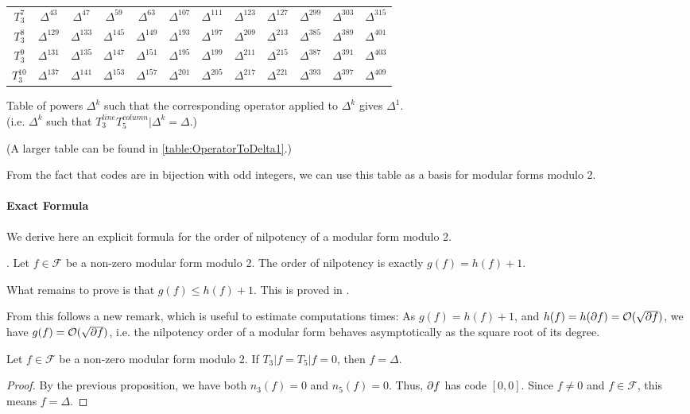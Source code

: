 \begin{center}
\begin{tabular}{|c||ccccccccccc|}
		$T_3^{7}$ & $\Delta^{43}$ & $\Delta^{47}$ & $\Delta^{59}$ & $\Delta^{63}$ & $\Delta^{107}$ & $\Delta^{111}$ & $\Delta^{123}$ & $\Delta^{127}$ & $\Delta^{299}$ & $\Delta^{303}$ & $\Delta^{315}$ \\
		$T_3^{8}$ & $\Delta^{129}$ & $\Delta^{133}$ & $\Delta^{145}$ & $\Delta^{149}$ & $\Delta^{193}$ & $\Delta^{197}$ & $\Delta^{209}$ & $\Delta^{213}$ & $\Delta^{385}$ & $\Delta^{389}$ & $\Delta^{401}$ \\
		$T_3^{9}$ & $\Delta^{131}$ & $\Delta^{135}$ & $\Delta^{147}$ & $\Delta^{151}$ & $\Delta^{195}$ & $\Delta^{199}$ & $\Delta^{211}$ & $\Delta^{215}$ & $\Delta^{387}$ & $\Delta^{391}$ & $\Delta^{403}$ \\
		$T_3^{10}$ & $\Delta^{137}$ & $\Delta^{141}$ & $\Delta^{153}$ & $\Delta^{157}$ & $\Delta^{201}$ & $\Delta^{205}$ & $\Delta^{217}$ & $\Delta^{221}$ & $\Delta^{393}$ & $\Delta^{397}$ & $\Delta^{409}$ \\
		\hline
	\end{tabular}

	Table of powers $\Delta^k$ such that the corresponding operator applied to $\Delta^k$ gives $\Delta^1$.\\
	(i.e. $\Delta^k$ such that $T_3^{line}T_5^{column}|\Delta^k = \Delta$.)
\end{center}
(A larger table can be found in \ref{table:OperatorToDelta1}.)

From the fact that codes are in bijection with odd integers, we can use this table as a basis for modular forms modulo 2.


\paragraph{Exact Formula}
We derive here an explicit formula for the order of nilpotency of a modular form modulo 2.
\label{theoremOrderOfNilpotency}
\begin{theorem} \cite[§5]{OrdreNilpotenceOperateurHecke}.
	Let $f \in \mathcal{F}$ be a non-zero modular form modulo 2.
	The order of nilpotency is exactly $g(f) = h(f) + 1$.
\end{theorem}
What remains to prove is that $g(f) \leq h(f) + 1$.
This is proved in \cite[§5]{OrdreNilpotenceOperateurHecke}.

From this follows a new remark, which is useful to estimate computations times:
As $g(f)=h(f)+1$, and $h(f) = h(\partial f) = \mathcal{O}(\sqrt{\partial f})$, we have $g(f) = \mathcal{O}(\sqrt{\partial f})$, i.e. the nilpotency order of a modular form behaves asymptotically as the square root of its degree.

\label{corollaryOrderOfNilpotency}
\begin{corollary}
	Let $f \in \mathcal{F}$ be a non-zero modular form modulo 2.
	If $T_3|f = T_5|f = 0$, then $f = \Delta$.
\end{corollary}
\begin{proof}
	By the previous proposition, we have both $n_3(f)=0$ and $n_5(f)=0$.
	Thus, $\partial f$ has code $\left[ 0,0 \right]$.
	Since $f \neq 0$ and $f \in \mathcal{F}$, this means $f = \Delta$.
\end{proof}
